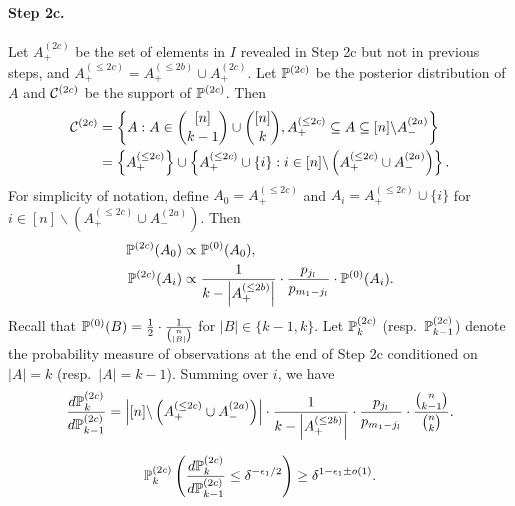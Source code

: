 \paragraph{Step 2c.}
Let $A_+^{(2c)}$ be the set of elements in $I$ revealed in Step 2c but not in previous steps, and $A_+^{(\le 2c)} = A_+^{(\le 2b)} \cup A_+^{(2c)}$.
Let $\mathbb{P}^{(2c)}$ be the posterior distribution of $A$ and $\mathcal{C}^{(2c)}$ be the support of $\mathbb{P}^{(2c)}$.
Then
\begin{align*}
  \mathcal{C}^{(2c)}&=\left\{ A : A\in \binom{[n]}{k-1} \cup \binom{[n]}k, A_+^{(\le 2c)} \subseteq A \subseteq [n]\backslash A_-^{(2a)}\right\} \\
  \nonumber &= \left\{A_+^{(\le 2c)}\right\} \cup \left\{ A_+^{(\le 2c)} \cup \{i\}: i\in [n]\backslash \left(A_+^{(\le 2c)} \cup A_-^{(2a)}\right)\right\}.
\end{align*}
For simplicity of notation, define $A_0 = A_+^{(\le 2c)}$ and $A_i = A_+^{(\le 2c)} \cup \{i\}$ for $i\in [n]\backslash \left(A_+^{(\le 2c)} \cup A_-^{(2a)}\right)$.
Then
\begin{align*}
  \mathbb{P}^{(2c)}(A_0) &\propto \mathbb{P}^{(0)}(A_0),\\
  \mathbb{P}^{(2c)}(A_i) &\propto \frac{1}{k-\left| A_+^{(\le 2b)} \right|} \cdot \frac{p_{j_l}}{p_{m_1-j_l}} \cdot \mathbb{P}^{(0)}(A_i).
\end{align*}
Recall that $\mathbb{P}^{(0)}(B) = \frac 12 \cdot \frac 1{\binom {n}{|B|}}$ for $|B|\in \{k-1,k\}$.
Let $\mathbb{P}^{(2c)}_k$ (resp.~$\mathbb{P}^{(2c)}_{k-1}$) denote the probability measure of observations at the end of Step 2c conditioned on $|A|=k$ (resp.~$|A|=k-1$).
Summing over $i$, we have
\begin{align*}
  \frac{d \mathbb{P}^{(2c)}_k}{d \mathbb{P}^{(2c)}_{k-1}} =\left| [n]\backslash \left(A_+^{(\le 2c)} \cup A_-^{(2a)}\right) \right|\cdot \frac{1}{k-\left| A_+^{(\le 2b)} \right|} \cdot \frac{p_{j_l}}{p_{m_1-j_l}} \cdot \frac{\binom n{k-1}}{\binom nk}.
\end{align*}
\begin{lemma} \label{lem:th:step-2c}
  \begin{align*}
    \mathbb{P}^{(2c)}_k \left(\frac{d \mathbb{P}^{(2c)}_k}{d \mathbb{P}^{(2c)}_{k-1}} \le \delta^{-\epsilon_1/2}\right) \ge \delta^{1-\epsilon_1 \pm o(1)}.
  \end{align*}
\end{lemma}
